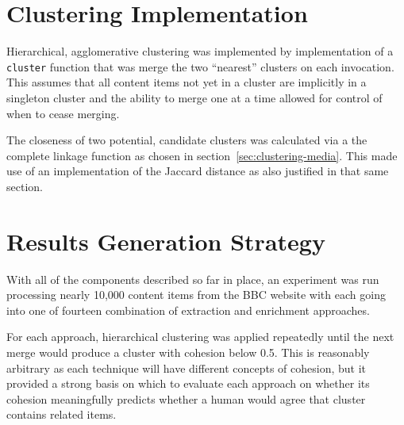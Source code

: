 \section{Clustering Implementation}

Hierarchical, agglomerative clustering was implemented by implementation
of a \texttt{cluster} function that was merge the two ``nearest''
clusters on each invocation. This assumes that all content items not
yet in a cluster are implicitly in a singleton cluster and the ability
to merge one at a time allowed for control of when to cease merging.

The closeness of two potential, candidate clusters was calculated via
a the complete linkage function as chosen in section~\ref{sec:clustering-media}.
This made use of an implementation of the Jaccard distance as also
justified in that same section.

\section{Results Generation Strategy}

With all of the components described so far in place, an experiment
was run processing nearly 10,000 content items from the BBC website
with each going into one of fourteen combination of extraction
and enrichment approaches.

For each approach, hierarchical clustering was applied repeatedly
until the next merge would produce a cluster with cohesion below 0.5.
This is reasonably arbitrary as each technique will have different
concepts of cohesion, but it provided a strong basis on which to
evaluate each approach on whether its cohesion meaningfully predicts
whether a human would agree that cluster contains related items.
